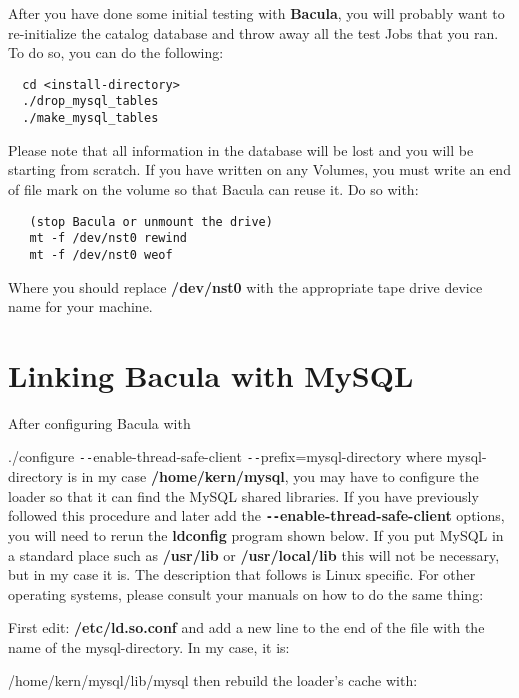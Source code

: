 After you have done some initial testing with {\bf Bacula}, you will probably
want to re-initialize the catalog database and throw away all the test Jobs
that you ran. To do so, you can do the following: 

\footnotesize
\begin{verbatim}
  cd <install-directory>
  ./drop_mysql_tables
  ./make_mysql_tables
\end{verbatim}
\normalsize

Please note that all information in the database will be lost and you will be
starting from scratch. If you have written on any Volumes, you must write an
end of file mark on the volume so that Bacula can reuse it. Do so with: 

\footnotesize
\begin{verbatim}
   (stop Bacula or unmount the drive)
   mt -f /dev/nst0 rewind
   mt -f /dev/nst0 weof
\end{verbatim}
\normalsize

Where you should replace {\bf /dev/nst0} with the appropriate tape drive
device name for your machine. 

\section{Linking Bacula with MySQL}

After configuring Bacula with 

./configure \verb:--:enable-thread-safe-client \verb:--:prefix=\lt{}mysql-directory\gt{}
where \lt{}mysql-directory\gt{} is in my case {\bf /home/kern/mysql}, you may
have to configure the loader so that it can find the MySQL shared libraries.
If you have previously followed this procedure and later add the {\bf
\verb:--:enable-thread-safe-client} options, you will need to rerun the {\bf
ldconfig} program shown below. If you put MySQL in a standard place such as
{\bf /usr/lib} or {\bf /usr/local/lib} this will not be necessary, but in my
case it is. The description that follows is Linux specific. For other
operating systems, please consult your manuals on how to do the same thing: 

First edit: {\bf /etc/ld.so.conf} and add a new line to the end of the file
with the name of the mysql-directory. In my case, it is: 

/home/kern/mysql/lib/mysql then rebuild the loader's cache with: 

